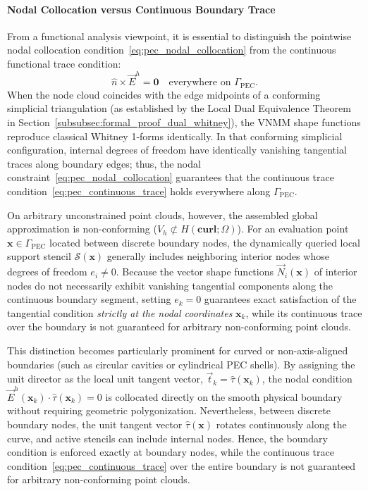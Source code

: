 \documentclass[preprint,12pt]{elsarticle}
\begin{document}
\paragraph{Nodal Collocation versus Continuous Boundary Trace}
From a functional analysis viewpoint, it is essential to distinguish the pointwise nodal collocation condition~\eqref{eq:pec_nodal_collocation} from the continuous functional trace condition:
\begin{equation}
    \hat{n} \times \vec{E}^h = \mathbf{0} \quad \text{everywhere on } \Gamma_{\text{PEC}}.
    \label{eq:pec_continuous_trace}
\end{equation}
When the node cloud coincides with the edge midpoints of a conforming simplicial triangulation (as established by the Local Dual Equivalence Theorem in Section~\ref{subsubsec:formal_proof_dual_whitney}), the VNMM shape functions reproduce classical Whitney 1-forms identically. In that conforming simplicial configuration, internal degrees of freedom have identically vanishing tangential traces along boundary edges; thus, the nodal constraint~\eqref{eq:pec_nodal_collocation} guarantees that the continuous trace condition~\eqref{eq:pec_continuous_trace} holds everywhere along $\Gamma_{\text{PEC}}$.

On arbitrary unconstrained point clouds, however, the assembled global approximation is non-conforming ($V_h \not\subset H(\mathbf{curl}; \Omega)$). For an evaluation point $\mathbf{x} \in \Gamma_{\text{PEC}}$ located between discrete boundary nodes, the dynamically queried local support stencil $\mathcal{S}(\mathbf{x})$ generally includes neighboring interior nodes whose degrees of freedom $e_i \neq 0$. Because the vector shape functions $\vec{N}_i(\mathbf{x})$ of interior nodes do not necessarily exhibit vanishing tangential components along the continuous boundary segment, setting $e_k = 0$ guarantees exact satisfaction of the tangential condition \emph{strictly at the nodal coordinates} $\mathbf{x}_k$, while its continuous trace over the boundary is not guaranteed for arbitrary non-conforming point clouds.

This distinction becomes particularly prominent for curved or non-axis-aligned boundaries (such as circular cavities or cylindrical PEC shells). By assigning the unit director as the local unit tangent vector, $\vec{t}_k = \hat{\tau}(\mathbf{x}_k)$, the nodal condition $\vec{E}^h(\mathbf{x}_k) \cdot \hat{\tau}(\mathbf{x}_k) = 0$ is collocated directly on the smooth physical boundary without requiring geometric polygonization. Nevertheless, between discrete boundary nodes, the unit tangent vector $\hat{\tau}(\mathbf{x})$ rotates continuously along the curve, and active stencils can include internal nodes. Hence, the boundary condition is enforced exactly at boundary nodes, while the continuous trace condition~\eqref{eq:pec_continuous_trace} over the entire boundary is not guaranteed for arbitrary non-conforming point clouds.
\end{document}

